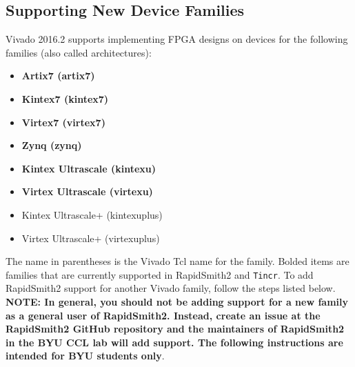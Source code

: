 \subsection{Supporting New Device Families} \label{sec:newFamilies}
Vivado 2016.2 supports implementing FPGA designs on devices for the following
families (also called architectures):

\begin{multicols}{2}
	\begin {itemize}
	  \item \textbf{Artix7 (artix7)}
	  \item \textbf{Kintex7 (kintex7)}
	  \item \textbf{Virtex7 (virtex7)}
	  \item \textbf{Zynq (zynq)}
	  \item \textbf{Kintex Ultrascale (kintexu)}
	  \item \textbf{Virtex Ultrascale (virtexu)}
	  \item Kintex Ultrascale+ (kintexuplus)
	  \item Virtex Ultrascale+ (virtexuplus)
	\end{itemize}
\end{multicols}

\noindent The name in parentheses is the Vivado Tcl name for the family. Bolded
items are families that are currently supported in RapidSmith2 and
\texttt{Tincr}. To add RapidSmith2 support for another Vivado family, follow the
steps listed below. \textbf{NOTE: In general, you should not be adding support
for a new family as a general user of RapidSmith2. Instead, create an issue at the
RapidSmith2 GitHub repository and the maintainers of RapidSmith2 in the BYU CCL
lab will add support. The following instructions are intended for BYU students
only}.

